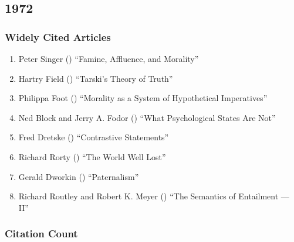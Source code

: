 \documentclass[
  10pt,
  letterpaper,
  DIV=11,
  numbers=noendperiod,
  twoside]{scrartcl}
\providecommand{\tightlist}{%
  \setlength{\itemsep}{0pt}\setlength{\parskip}{0pt}}\usepackage{longtable,booktabs,array}
\begin{document}
\newpage

\subsection{1972}\label{sec-s1972}

\subsubsection*{Widely Cited Articles}\label{widely-cited-articles-15}

\begin{enumerate}
\def\labelenumi{\arabic{enumi}.}
\tightlist
\item
  Peter Singer () ``Famine,
  Affluence, and Morality''
\item
  Hartry Field () ``Tarski's Theory
  of Truth''
\item
  Philippa Foot () ``Morality as
  a System of Hypothetical Imperatives''
\item
  Ned Block and Jerry A. Fodor ()
  ``What Psychological States Are Not''
\item
  Fred Dretske () ``Contrastive
  Statements''
\item
  Richard Rorty () ``The World Well
  Lost''
\item
  Gerald Dworkin ()
  ``Paternalism''
\item
  Richard Routley and Robert K. Meyer
  () ``The Semantics of
  Entailment --- II''
\end{enumerate}

\subsubsection*{Citation Count}\label{sec-count-1972}
\end{document}

